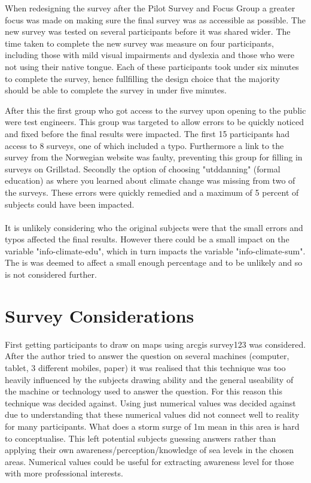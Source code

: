 When redesigning the survey after the Pilot Survey and Focus Group a greater focus was made on making sure the final survey was as accessible as possible. The new survey was tested on several participants before it was shared wider. The time taken to complete the new survey was measure on four participants, including those with mild visual impairments and dyslexia and those who were not using their native tongue. Each of these participants took under six minutes to complete the survey, hence fullfilling the design choice that the majority should be able to complete the survey in under five minutes. 

After this the first group who got access to the survey upon opening to the public were test engineers. This group was targeted to allow errors to be quickly noticed and fixed before the final results were impacted. The first 15 participants had access to 8 surveys, one of which included a typo. Furthermore a link to the survey from the Norwegian website was faulty, preventing this group for filling in surveys on Grillstad. Secondly the option of choosing "utddanning" (formal education) as where you learned about climate change was missing from two of the surveys. These errors were quickly remedied and a maximum of 5 percent of subjects could have been impacted. 

\paragraph{}
It is unlikely considering who the original subjects were that the small errors and typos affected the final results. However there could be a small impact on the variable "info-climate-edu", which in turn impacts the variable "info-climate-sum". The is was deemed to affect a small enough percentage and to be unlikely and so is not considered further.



\section{Survey Considerations}

First getting participants to draw on maps using arcgis survey123 was considered. After the author tried to answer the question on several machines (computer, tablet, 3 different mobiles, paper) it was realised that this technique was too heavily influenced by the subjects drawing ability and the general useability of the machine or technology used to answer the question. For this reason this technique was decided against.
Using just numerical values was decided against due to understanding that these numerical values did not connect well to reality for many participants. What does a storm surge of 1m mean in this area is hard to conceptualise. This left potential subjects guessing answers rather than applying their own awareness/perception/knowledge of sea levels in the chosen areas. Numerical values could be useful for extracting awareness level for those with more professional interests.
